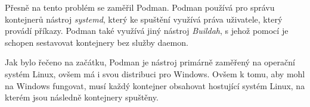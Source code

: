 Přesně na tento problém se zaměřil Podman. Podman používá pro správu kontejnerů nástroj \textit{systemd}, který ke spuštění využívá práva uživatele, který provádí příkazy. Podman také využívá jiný nástroj \textit{Buildah}, s jehož pomocí je schopen sestavovat kontejnery bez služby daemon.\,\cite{podman_vs_docker}

Jak bylo řečeno na začátku, Podman je nástroj primárně zaměřený na operační systém Linux, ovšem má i svou distribuci pro Windows. Ovšem k tomu, aby mohl na Windows fungovat, musí každý kontejner obsahovat hostující systém Linux, na kterém jsou následně kontejnery spuštěny.\,\cite{podman}\cite{podman_vs_docker}